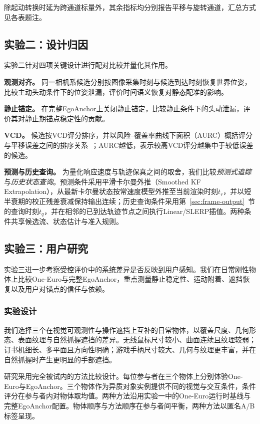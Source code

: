 \documentclass[review]{vgtc}
\begin{document}
除起动转换时延为跨通道标量外，其余指标均分别报告平移与旋转通道，汇总方式见各表题注。

\subsection{实验二：设计归因}\label{sec:exp2-design}

实验二针对四项关键设计进行配对比较并量化其作用。

\textbf{观测对齐。}
同一相机系候选分别按图像采集时刻与候选到达时刻恢复世界位姿，比较主动头动条件下的位姿泄漏，评价时间语义恢复对静态配准的影响。

\textbf{静止锚定。}
在完整EgoAnchor上关闭静止锚定，比较静止条件下的头动泄漏，评价其对静止期锚点稳定性的贡献。

\textbf{VCD。}
候选按VCD评分排序，并以风险--覆盖率曲线下面积（AURC）概括评分与平移误差之间的排序关系~\cite{riskcontrolled2020,ding2020uncertainty}；AURC越低，表示较高VCD评分越集中于较低误差的候选。

\textbf{预测与历史查询。}
为量化响应速度与轨迹保真之间的取舍，我们比较\emph{预测式追踪}与\emph{历史状态查询}。预测条件采用平滑卡尔曼外推（Smoothed KF Extrapolation），从最新卡尔曼状态按常速度模型外推至当前渲染时刻$t_r$，并以短半衰期的校正残差衰减保持输出连续；历史查询条件采用第~\ref{sec:frame-output}~节的查询时刻$t_q$，并在相邻的已到达轨迹节点之间执行Linear/SLERP插值。两种条件共享候选流、状态估计与准入规则。

\subsection{实验三：用户研究}\label{sec:exp3-design}

实验三进一步考察受控评价中的系统差异是否反映到用户感知。我们在日常刚性物体上比较One-Euro与完整EgoAnchor，重点测量静止稳定性、运动附着、遮挡恢复以及用户对锚点的信任与依赖。

\subsubsection{实验设计}

我们选择三个在视觉可观测性与操作遮挡上互补的日常物体，以覆盖尺度、几何形态、表面纹理与自然抓握遮挡的差异。无线鼠标尺寸较小、曲面连续且纹理较弱；订书机细长、多平面且方向性明确；游戏手柄尺寸较大、几何与纹理更丰富，并在自然抓握时产生更明显的手部遮挡。

研究采用完全被试内的方法比较设计。每位参与者在三个物体上分别体验One-Euro与EgoAnchor。三个物体作为异质对象实例提供不同的视觉与交互条件，条件评分在参与者内对物体取均值。两种方法沿用实验一中的One-Euro运行时基线与完整EgoAnchor配置。物体顺序与方法顺序在参与者间平衡，两种方法以匿名A/B标签呈现。
\end{document}
